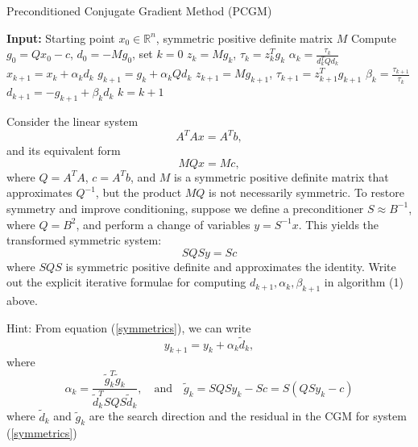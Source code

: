 \documentclass{ExerciseSheet}
\begin{document}
\begin{algorithm}[H]
\caption{Preconditioned Conjugate Gradient Method (PCGM)}
\begin{algorithmic}[1]
\STATE \textbf{Input:} Starting point $x_0 \in \mathbb{R}^n$, symmetric positive definite matrix $M$
\STATE Compute $g_0 = Qx_0 - c$, $d_0 = -Mg_0$, set $k = 0$
    \STATE $z_k = M g_k$, \quad $\tau_k = z_k^T g_k$ \hfill
    \STATE $\alpha_k = \frac{\tau_k}{d_k^T Q d_k}$ \hfill 
    \STATE $x_{k+1} = x_k + \alpha_k d_k$ \hfill 
    \STATE $g_{k+1} = g_k + \alpha_k Q d_k$ \hfill 
    \STATE $z_{k+1} = M g_{k+1}$, \quad $\tau_{k+1} = z_{k+1}^T g_{k+1}$ \hfill 
    \STATE $\beta_k = \frac{\tau_{k+1}}{\tau_k}$ \hfill
    \STATE $d_{k+1} = -g_{k+1} + \beta_k d_k$ \hfill 
    \STATE $k = k + 1$
\ENDWHILE
\end{algorithmic}
\end{algorithm}
\begin{problem}
Consider the linear system
\[
A^TAx = A^Tb,
\]
and its equivalent form
\[
MQx = Mc,
\]
where $Q = A^TA$, $c = A^Tb$, and $M$ is a symmetric positive definite matrix that approximates $Q^{-1}$, but the product $MQ$ is not necessarily symmetric. To restore symmetry and improve conditioning, suppose we define a preconditioner $S \approx B^{-1}$, where $Q = B^2$, and perform a change of variables $y = S^{-1}x$. This yields the transformed symmetric system:
\begin{equation} \label{symmetrics}
SQSy = Sc 
\end{equation}
where $SQS$ is symmetric positive definite and approximates the identity.
Write out the explicit iterative formulae for computing $d_{k+1}, \alpha_k, \beta_{k+1}$ in algorithm (1) above.

Hint: From equation (\ref{symmetrics}), we can write
\[
y_{k+1} = y_k + \alpha_k \tilde{d}_k,
\]
where
\[
\alpha_k = \frac{\tilde{g}_k^T \tilde{g}_k}{\tilde{d}_k^T SQS \tilde{d}_k},
\quad \text{and} \quad
\tilde{g}_k = SQS y_k - Sc = S(QSy_k - c)
\] where $\tilde{d}_k $ and $\tilde{g}_k$ are the search direction and the residual in the CGM for system (\ref{symmetrics})
\end{problem}
\end{document}
